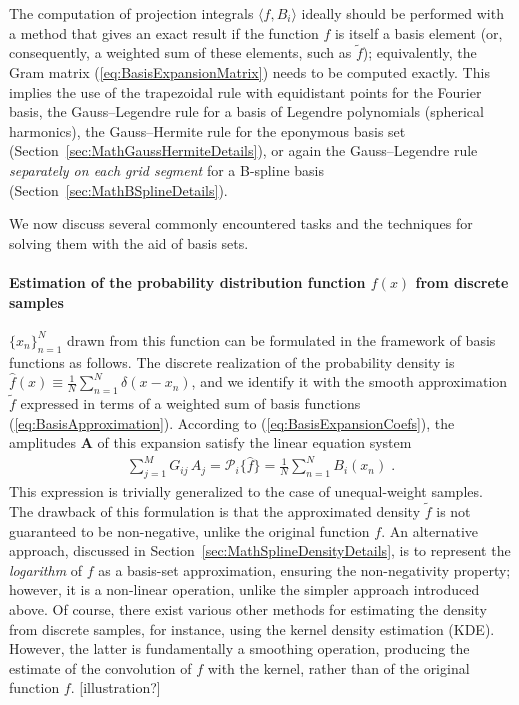 \documentclass[12pt]{article}
\begin{document}
The computation of projection integrals $\langle f, B_i\rangle$ ideally should be performed with a method that gives an exact result if the function $f$ is itself a basis element (or, consequently, a weighted sum of these elements, such as $\tilde f$); equivalently, the Gram matrix (\ref{eq:BasisExpansionMatrix}) needs to be computed exactly. This implies the use of the trapezoidal rule with equidistant points for the Fourier basis, the Gauss--Legendre rule for a basis of Legendre polynomials (spherical harmonics), the Gauss--Hermite rule for the eponymous basis set  (Section~\ref{sec:MathGaussHermiteDetails}), or again the Gauss--Legendre rule \textit{separately on each grid segment} for a B-spline basis (Section~\ref{sec:MathBSplineDetails}).

We now discuss several commonly encountered tasks and the techniques for solving them with the aid of basis sets.

\paragraph{Estimation of the probability distribution function $f(x)$ from discrete samples} $\{x_n\}_{n=1}^{N}$ drawn from this function can be formulated in the framework of basis functions as follows. The discrete realization of the probability density is $\hat f(x) \equiv \frac{1}{N} \sum_{n=1}^{N} \delta(x-x_n)$, and we identify it with the smooth approximation $\tilde f$ expressed in terms of a weighted sum of basis functions (\ref{eq:BasisApproximation}). According to (\ref{eq:BasisExpansionCoefs}), the amplitudes $\boldsymbol A$ of this expansion satisfy the linear equation system
\begin{align}
\sum_{j=1}^M G_{ij}\, A_j = \mathcal{P}_i \{\hat f\} = \frac{1}{N} \sum_{n=1}^{N} B_i(x_n) \;.
\end{align}
This expression is trivially generalized to the case of unequal-weight samples.\\
The drawback of this formulation is that the approximated density $\tilde f$ is not guaranteed to be non-negative, unlike the original function $f$. An alternative approach, discussed in Section~\ref{sec:MathSplineDensityDetails}, is to represent the \textit{logarithm} of $f$ as a basis-set approximation, ensuring the non-negativity property; however, it is a non-linear operation, unlike the simpler approach introduced above. Of course, there exist various other methods for estimating the density from discrete samples, for instance, using the kernel density estimation (KDE). However, the latter is fundamentally a smoothing operation, producing the estimate of the convolution of $f$ with the kernel, rather than of the original function $f$. [illustration?]
\end{document}
